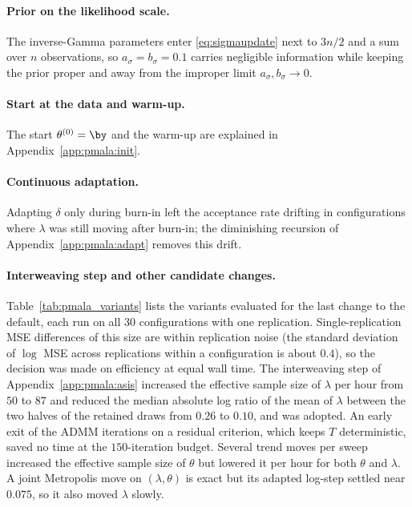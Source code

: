 \paragraph{Prior on the likelihood scale.} The inverse-Gamma parameters enter \eqref{eq:sigmaupdate} next to $3n/2$ and a sum over $n$ observations, so $a_\sigma = b_\sigma = 0.1$ carries negligible information while keeping the prior proper and away from the improper limit $a_\sigma, b_\sigma \to 0$.

\paragraph{Start at the data and warm-up.} The start $\theta^{(0)} = \by$ and the warm-up are explained in Appendix~\ref{app:pmala:init}.

\paragraph{Continuous adaptation.} Adapting $\delta$ only during burn-in left the acceptance rate drifting in configurations where $\lambda$ was still moving after burn-in; the diminishing recursion of Appendix~\ref{app:pmala:adapt} removes this drift.

\paragraph{Interweaving step and other candidate changes.} Table~\ref{tab:pmala_variants} lists the variants evaluated for the last change to the default, each run on all $30$ configurations with one replication. Single-replication MSE differences of this size are within replication noise (the standard deviation of $\log$ MSE across replications within a configuration is about $0.4$), so the decision was made on efficiency at equal wall time. The interweaving step of Appendix~\ref{app:pmala:asis} increased the effective sample size of $\lambda$ per hour from $50$ to $87$ and reduced the median absolute log ratio of the mean of $\lambda$ between the two halves of the retained draws from $0.26$ to $0.10$, and was adopted. An early exit of the ADMM iterations on a residual criterion, which keeps $T$ deterministic, saved no time at the $150$-iteration budget. Several trend moves per sweep increased the effective sample size of $\theta$ but lowered it per hour for both $\theta$ and $\lambda$. A joint Metropolis move on $(\lambda, \theta)$ is exact but its adapted log-step settled near $0.075$, so it also moved $\lambda$ slowly.

